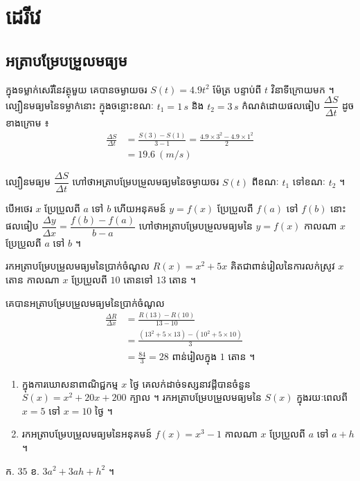 \section{ដេរីវេ}
\subsection{អត្រាបម្រែបម្រួលមធ្យម}

\begin{example}[ឧទាហរណ៍]
ក្នុងទម្លាក់សេរីនៃវត្ថុមួយ គេបានចម្ងាយចរ $S(t) = 4.9t^2$ ម៉ែត្រ បន្ទាប់ពី $t$ វិនាទីក្រោយមក ។ ល្បឿនមធ្យមនៃទម្លាក់នោះ ក្នុងចន្លោះខណៈ $t_1 = 1\,s$ និង $t_2 = 3\,s$ កំណត់ដោយផលធៀប $\dfrac{\Delta S}{\Delta t}$ ដូចខាងក្រោម ៖
\[
\begin{aligned}
\frac{\Delta S}{\Delta t} &= \frac{S(3) - S(1)}{3 - 1} = \frac{4.9\times 3^2 - 4.9\times 1^2}{2}\\
&= 19.6 \ (m/s)
\end{aligned}
\]
\end{example}
ល្បឿនមធ្យម $\dfrac{\Delta S}{\Delta t}$ ហៅថាអត្រាបម្រែបម្រួលមធ្យមនៃចម្ងាយចរ $S(t)$ ពីខណៈ $t_1$ ទៅខណៈ $t_2$ ។

\begin{formulaBox}[ជាទូទៅ]
បើអថេរ $x$ ប្រែប្រួលពី $a$ ទៅ $b$ ហើយអនុគមន៍ $y = f(x)$ ប្រែប្រួលពី $f(a)$ ទៅ $f(b)$ នោះផលធៀប $\dfrac{\Delta y}{\Delta x} = \dfrac{f(b) - f(a)}{b - a}$ ហៅថាអត្រាបម្រែបម្រួលមធ្យមនៃ $y = f(x)$ កាលណា $x$ ប្រែប្រួលពី $a$ ទៅ $b$ ។
\end{formulaBox}

\begin{example}[លំហាត់គំរូ]
រកអត្រាបម្រែបម្រួលមធ្យមនៃប្រាក់ចំណូល $R(x) = x^2 + 5x$ គិតជាពាន់រៀលនៃការលក់ស្រូវ $x$ តោន កាលណា $x$ ប្រែប្រួលពី $10$ តោនទៅ $13$ តោន ។
\end{example}
\ans
គេបានអត្រាបម្រែបម្រួលមធ្យមនៃប្រាក់ចំណូល
\[ \begin{aligned}
\frac{\Delta R}{\Delta x} &= \frac{R(13) - R(10)}{13 - 10}\\
&= \frac{(13^2 + 5\times 13) - (10^2 + 5\times 10)}{3}\\
&= \frac{84}{3} = 28 \text{ ពាន់រៀលក្នុង } 1 \text{ តោន ។}
\end{aligned} \]

\begin{pro}
\begin{enumerate}[a]
  \item ក្នុងការឃោសនាពាណិជ្ជកម្ម $x$ ថ្ងៃ គេលក់ដាច់ទស្សនាវដ្ដីបានចំនួន $S(x) = x^2 + 20x + 200$ ក្បាល ។ រកអត្រាបម្រែបម្រួលមធ្យមនៃ $S(x)$ ក្នុងរយៈពេលពី $x = 5$ ទៅ $x = 10$ ថ្ងៃ ។
  \item រកអត្រាបម្រែបម្រួលមធ្យមនៃអនុគមន៍ $f(x) = x^3 - 1$ កាលណា $x$ ប្រែប្រួលពី $a$ ទៅ $a + h$ ។
\end{enumerate}
\ans
ក. $35$ \quad ខ. $3a^2 + 3ah + h^2$ ។
\end{pro}


